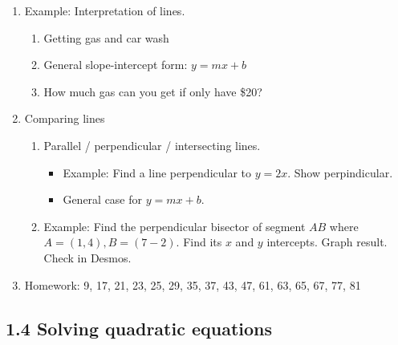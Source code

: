 \documentclass{article}
\begin{document}
\begin{enumerate}
\item Example: Interpretation of lines.
\begin{enumerate}
\item Getting gas and car wash
\item General slope-intercept form: $y=mx+b$
\item How much gas can you get if only have \$20?
\end{enumerate}

\item Comparing lines
\begin{enumerate}
\item Parallel / perpendicular / intersecting lines.
\begin{itemize}
\item Example: Find a line perpendicular to $y=2x$. Show perpindicular.
\item General case for $y=mx+b$.
\end{itemize}
\item Example: Find the perpendicular bisector of segment $AB$ where $A=(1,4), B=(7-2)$. Find its $x$ and $y$ intercepts. Graph result. Check in Desmos.
\end{enumerate}

\item Homework: 9, 17, 21, 23, 25, 29, 35, 37, 43, 47, 61, 63, 65, 67, 77, 81
\end{enumerate}


\subsection{1.4 Solving quadratic equations}
\end{document}
